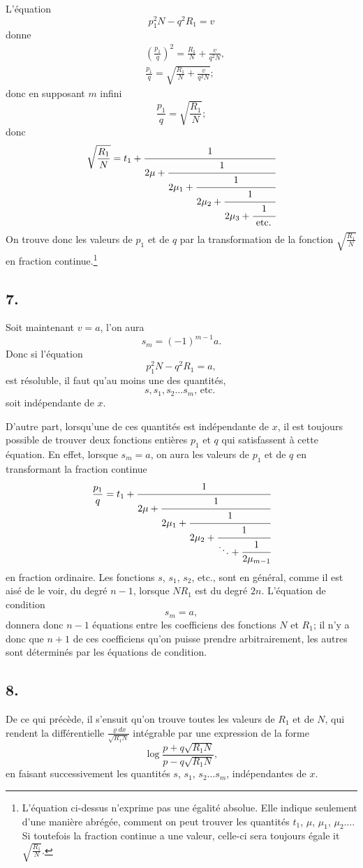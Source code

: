 \documentclass[oneside, 12 pt, leqno]{memoir}
\begin{document}
L'équation
\[p_1^2 N-q^2 R_1=v\]
donne
\[\begin{aligned}
& \left(\frac{p_1}{q}\right)^2=\frac{R_1}{N}+\frac{v}{q^2 N}, \\
& \frac{p_1}{q}=\sqrt{\frac{R_1}{N}+\frac{v}{q^2 N}};
\end{aligned}\]
donc en supposant \(m\) infini
\[\frac{p_1}{q}=\sqrt{\frac{R_1}{N}};\]
donc
\[\sqrt{\frac{R_1}{N}}=t_1+\cfrac{1}{2 \mu+\cfrac{1}{2 \mu_1+\cfrac{1}{2 \mu_2+\cfrac{1}{2 \mu_3+\cfrac{1}{\text { etc. }}}}}}\]
On trouve donc les valeurs de \(p_1\) et de \(q\) par la transformation de la fonction \(\sqrt{\frac{R_1}{N}}\) en fraction continue.\footnote{L'équation ci-dessus n'exprime pas une égalité absolue. Elle indique seulement d'une manière abrégée, comment on peut trouver les quantités \(t_1\), \(\mu\), \(\mu_1\), \(\mu_2 \dots\). Si toutefois la fraction continue a une valeur, celle-ci sera toujours égale it \(\sqrt{\frac{R_1}{N}}\). }

\subsection*{7.}

Soit maintenant \(v=a\), l'on aura
\[s_m=(-1)^{m-1} a.\]
Donc si l'équation
\[p_1^2 N-q^2 R_1=a,\]
est résoluble, il faut qu'au moins une des quantités,
\[s, s_1, s_2 \dots s_m \text {, etc. }\]
soit indépendante de \(x\).

D'autre part, lorsqu'une de ces quantités est indépendante de \(x\), il est toujours possible de trouver deux fonctions entières \(p_1\) et \(q\) qui satisfassent à cette équation. En effet, lorsque \(s_m=a\), on aura les valeurs de \(p_1\) et de \(q\) en transformant la fraction continue
\[\frac{p_1}{q}=t_1+\cfrac{1}{2 \mu+\cfrac{1}{2 \mu_1+\cfrac{1}{2 \mu_2+\cfrac{1}{\ddots+\cfrac{1}{2 \mu_{m-1}}}}}}\]
en fraction ordinaire. Les fonctions \(s\), \(s_1\), \(s_2\), etc., sont en général, comme il est aisé de le voir, du degré \(n-1\), lorsque \(N R_1\) est du degré \(2 n\). L'équation de condition
\[s_m=a,\]
donnera donc \(n-1\) équations entre les coefficiens des fonctions \(N\) et \(R_1\); il n'y a donc que \(n+1\) de ces coefficiens qu'on puisse prendre arbitrairement, les autres sont déterminés par les équations de condition.

\subsection*{8.}

De ce qui précède, il s'ensuit qu'on trouve toutes les valeurs de \(R_1\) et de \(N\), qui rendent la différentielle \(\frac{\varrho d x}{\sqrt{R_1 N}}\) intégrable par une expression de la forme
\[\log \frac{p+q \sqrt{R_1 N}}{p-q \sqrt{ R_1 N}},\]
en faisant successivement les quantités \(s\), \(s_1\), \(s_2 \dots s_m\), indépendantes de \(x\). 
\end{document}
